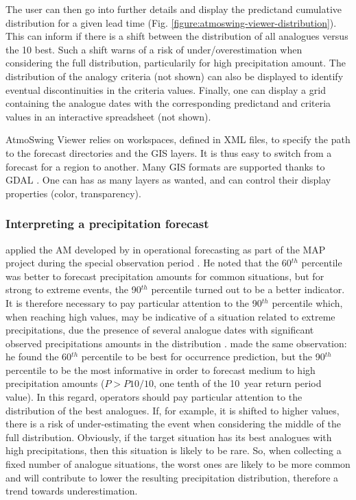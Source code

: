 \documentclass[review]{elsarticle}
\begin{document}
The user can then go into further details and display the predictand cumulative distribution for a given lead time (Fig. \ref{figure:atmoswing-viewer-distribution}). This can inform if there is a shift between the distribution of all analogues versus the 10 best. Such a shift warns of a risk of under/overestimation when considering the full distribution, particularily for high precipitation amount. The distribution of the analogy criteria (not shown) can also be displayed to identify eventual discontinuities in the criteria values. Finally, one can display a grid containing the analogue dates with the corresponding predictand and criteria values in an interactive spreadsheet (not shown).

AtmoSwing Viewer relies on workspaces, defined in XML files, to specify the path to the forecast directories and the GIS layers. It is thus easy to switch from a forecast for a region to another. Many GIS formats are supported thanks to GDAL \cite[Geospatial Data Abstraction Library,][]{GDAL2014}. One can has as many layers as wanted, and can control their display properties (color, transparency).


\subsubsection{Interpreting a precipitation forecast}
\label{sec:interpreting}

\citet{Djerboua2001} applied the AM developed by \citet{Guilbaud1997} in operational forecasting as part of the MAP project \citep[\textit{Mesoscale Alpine Programme}, see][]{Binder1996} during the special observation period \citep{Bougeault2001}. He noted that the 60$^{th}$ percentile was better to forecast precipitation amounts for common situations, but for strong to extreme events, the 90$^{th}$ percentile turned out to be a better indicator. It is therefore necessary to pay particular attention to the 90$^{th}$ percentile which, when reaching high values, may be indicative of a situation related to extreme precipitations, due the presence of several analogue dates with significant observed precipitations amounts in the distribution \citep{Djerboua2001}. \citet{Bontron2004} made the same observation: he found the 60$^{th}$ percentile to be best for occurrence prediction, but the 90$^{th}$ percentile to be the most informative in order to forecast medium to high precipitation amounts ($P > P10/10$, one tenth of the 10~year return period value). In this regard, operators should pay particular attention to the distribution of the best analogues. If, for example, it is shifted to higher values, there is a risk of under-estimating the event when considering the middle of the full distribution. Obviously, if the target situation has its best analogues with high precipitations, then this situation is likely to be rare. So, when collecting a fixed number of analogue situations, the worst ones are likely to be more common and will contribute to lower the resulting precipitation distribution, therefore a trend towards underestimation.
\end{document}
